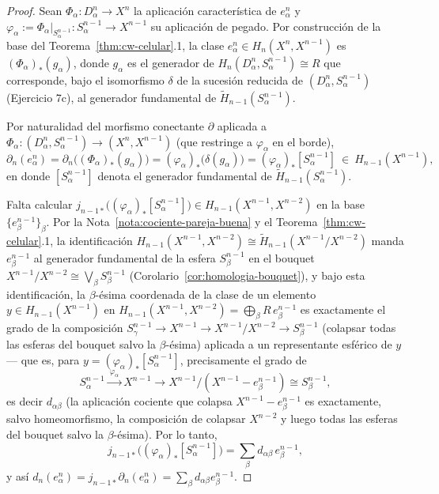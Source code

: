\documentclass[11pt,a4paper]{article}
\theoremstyle{plain}
\theoremstyle{definition}
\theoremstyle{remark}
\begin{document}
\begin{proof}
Sean $\Phi_\alpha:D^n_\alpha\to X^n$ la aplicación característica de
$e^n_\alpha$ y $\varphi_\alpha:=\Phi_\alpha|_{S^{n-1}_\alpha}:S^{n-1}_\alpha\to X^{n-1}$
su aplicación de pegado. Por construcción de la base del
Teorema~\ref{thm:cw-celular}.1, la clase $e^n_\alpha\in H_n(X^n,X^{n-1})$
es $(\Phi_\alpha)_*(g_\alpha)$, donde $g_\alpha$ es el generador de
$H_n(D^n_\alpha,S^{n-1}_\alpha)\cong R$ que corresponde, bajo el
isomorfismo $\delta$ de la sucesión reducida de $(D^n_\alpha,S^{n-1}_\alpha)$
(Ejercicio 7c), al generador fundamental de
$\tilde H_{n-1}(S^{n-1}_\alpha)$.

Por naturalidad del morfismo conectante $\partial$ aplicada a
$\Phi_\alpha:(D^n_\alpha,S^{n-1}_\alpha)\to(X^n,X^{n-1})$ (que restringe a
$\varphi_\alpha$ en el borde),
\[
\partial_n(e^n_\alpha)=\partial_n\big((\Phi_\alpha)_*(g_\alpha)\big)=(\varphi_\alpha)_*\big(\delta(g_\alpha)\big)=(\varphi_\alpha)_*[S^{n-1}_\alpha]\ \in\ H_{n-1}(X^{n-1}),
\]
en donde $[S^{n-1}_\alpha]$ denota el generador fundamental de
$\tilde H_{n-1}(S^{n-1}_\alpha)$.

Falta calcular $j_{n-1*}\big((\varphi_\alpha)_*[S^{n-1}_\alpha]\big)\in H_{n-1}(X^{n-1},X^{n-2})$
en la base $\{e^{n-1}_\beta\}_\beta$. Por la Nota~\ref{nota:cociente-pareja-buena}
y el Teorema~\ref{thm:cw-celular}.1, la identificación
$H_{n-1}(X^{n-1},X^{n-2})\cong\tilde H_{n-1}(X^{n-1}/X^{n-2})$ manda
$e^{n-1}_\beta$ al generador fundamental de la esfera $S^{n-1}_\beta$ en
el bouquet $X^{n-1}/X^{n-2}\cong\bigvee_\beta S^{n-1}_\beta$
(Corolario~\ref{cor:homologia-bouquet}), y bajo esta identificación, la
$\beta$-ésima coordenada de la clase de un elemento
$y\in H_{n-1}(X^{n-1})$ en $H_{n-1}(X^{n-1},X^{n-2})=\bigoplus_\beta R\,e^{n-1}_\beta$
es exactamente el grado de la composición
$S^{n-1}_\gamma\to X^{n-1}\to X^{n-1}/X^{n-2}\to S^{n-1}_\beta$ (colapsar
todas las esferas del bouquet salvo la $\beta$-ésima) aplicada a un
representante esférico de $y$ --- que es, para $y=(\varphi_\alpha)_*[S^{n-1}_\alpha]$,
precisamente el grado de
\[
S^{n-1}_\alpha\xrightarrow{\ \varphi_\alpha\ }X^{n-1}\longrightarrow X^{n-1}/(X^{n-1}-e^{n-1}_\beta)\cong S^{n-1}_\beta,
\]
es decir $d_{\alpha\beta}$ (la aplicación cociente que colapsa
$X^{n-1}-e^{n-1}_\beta$ es exactamente, salvo homeomorfismo, la
composición de colapsar $X^{n-2}$ y luego todas las esferas del bouquet
salvo la $\beta$-ésima). Por lo tanto,
\[
j_{n-1*}\big((\varphi_\alpha)_*[S^{n-1}_\alpha]\big)=\sum_\beta d_{\alpha\beta}\,e^{n-1}_\beta,
\]
y así $d_n(e^n_\alpha)=j_{n-1*}\partial_n(e^n_\alpha)=\sum_\beta d_{\alpha\beta}e^{n-1}_\beta$.
\end{proof}
\end{document}
